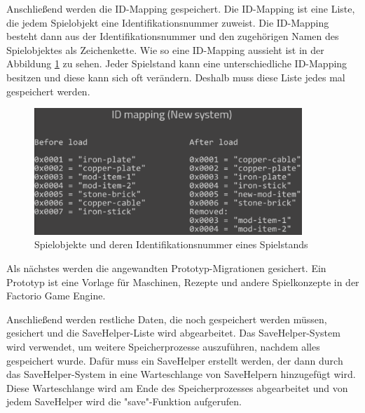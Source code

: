 Anschließend werden die ID-Mapping gespeichert.\cite{factorioGithubSaveLoad} Die ID-Mapping ist eine Liste, die jedem Spielobjekt eine Identifikationsnummer zuweist. Die ID-Mapping besteht dann aus der Identifikationsnummer und den zugehörigen Namen des Spielobjektes als Zeichenkette. Wie so eine ID-Mapping aussieht ist in der Abbildung \ref{fig:factorioIdMapping} zu sehen. Jeder Spielstand kann eine unterschiedliche ID-Mapping besitzen und diese kann sich oft verändern. Deshalb muss diese Liste jedes mal gespeichert werden.\cite{factorioFridayFacts259} 

\begin{figure}[htp]
    \centering
    \includegraphics[width=0.9\textwidth]{images/id_mapping_factorio.png}
    \caption{Spielobjekte und deren Identifikationsnummer eines Spielstands\cite{factorioFridayFacts259}}
    \label{fig:factorioIdMapping}
\end{figure}

Als nächstes werden die angewandten Prototyp-Migrationen gesichert.\cite{factorioGithubSaveLoad} Ein Prototyp ist eine Vorlage für Maschinen, Rezepte und andere Spielkonzepte in der Factorio Game Engine.\cite{factorioPrototypesDocs}

Anschließend werden restliche Daten, die noch gespeichert werden müssen, gesichert und die SaveHelper-Liste wird abgearbeitet. Das SaveHelper-System wird verwendet, um weitere Speicherprozesse auszuführen, nachdem alles gespeichert wurde. Dafür muss ein SaveHelper erstellt werden, der dann durch das SaveHelper-System in eine Warteschlange von SaveHelpern hinzugefügt wird. Diese Warteschlange wird am Ende des Speicherprozesses abgearbeitet und von jedem SaveHelper wird die "save"-Funktion aufgerufen.\cite{factorioGithubSaveLoad}



